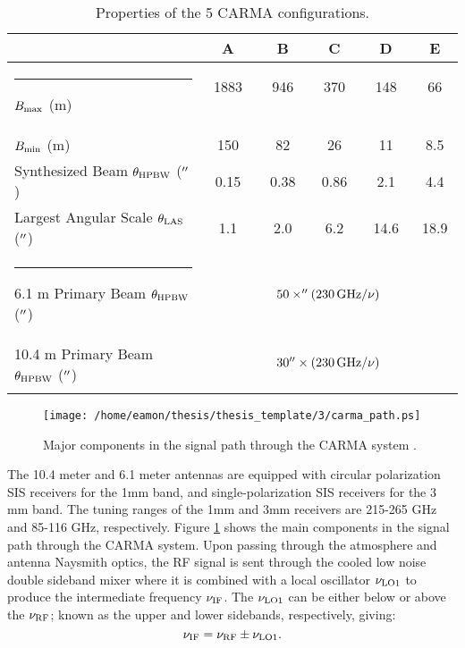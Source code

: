 \begin{table}[!hbt]
\begin{center}
\caption[Properties of the 5 CARMA configurations.]
{Properties of the 5 CARMA configurations.}
\begin{tabular}{lccccc}
\hline
\hline
\rule{0pt}{2.5ex} & A & B & C & D & E \\
\hline
\rule{-4.0pt}{2.5ex} $B_{\rm{max}}$ (m) &1883 \ \ & 946 \ \ & 370 \ \ & 148 \ \ & 66 \ \ \\
$B_{\rm{min}}$ (m)& 150& 82& 26& 11& 8.5\\ 
Synthesized Beam $\theta _{\rm{HPBW}}$ ($^{\prime\prime}$)& 0.15& 0.38& 0.86& 2.1& 4.4\\ 
Largest Angular Scale $\theta _{\rm{LAS}}$ ($^{\prime\prime}$) & 1.1& 2.0& 6.2& 14.6& 18.9\\ 
\hline
\rule{-4.0pt}{2.5ex} 6.1 m Primary Beam $\theta _{\rm{HPBW}}$ ($^{\prime\prime}$) & \multicolumn{5}{c}{$50\times ^{\prime\prime}(230\,\rm{GHz}/\nu)$} \\ 
10.4 m Primary Beam $\theta _{\rm{HPBW}}$ ($^{\prime\prime}$) & \multicolumn{5}{c}{$30^{\prime\prime} \times (230\,\rm{GHz}/\nu)$} \\ 
\hline
\rule{0pt}{2.0ex}
\end{tabular}
\label{tab:3.2}
\end{center}
\end{table}
\begin{figure}[!ht]
\centering 
          \texttt{[image: /home/eamon/thesis/thesis\_template/3/carma\_path.ps]}
\caption[Major components in the signal path for CARMA.]{Major components in the signal path through the CARMA system \citep{wei_2008}.}
\label{fig3.4}
\end{figure}
The 10.4 meter and 6.1 meter antennas are equipped with circular polarization  SIS receivers for the 1mm band, and single-polarization SIS receivers for the 3 mm band. The tuning ranges of the 1mm and 3mm receivers are 215-265 GHz and 85-116 GHz, respectively. Figure \ref{fig3.4} shows the main components in the signal path through the CARMA system. Upon passing through the atmosphere and antenna Naysmith optics, the RF signal is sent through the cooled low noise double sideband mixer where it is combined with a local oscillator $\nu _{\rm{LO1}}$ to produce the intermediate frequency $\nu _{\rm{IF}}$. The $\nu _{\rm{LO1}}$ can be either below or above the $\nu _{\rm{RF}}$; known as the upper and lower sidebands, respectively, giving:
\begin{equation}
\nu _{\rm{IF}}=\nu _{\rm{RF}}\pm \nu _{\rm{LO1}}.
\end{equation}

